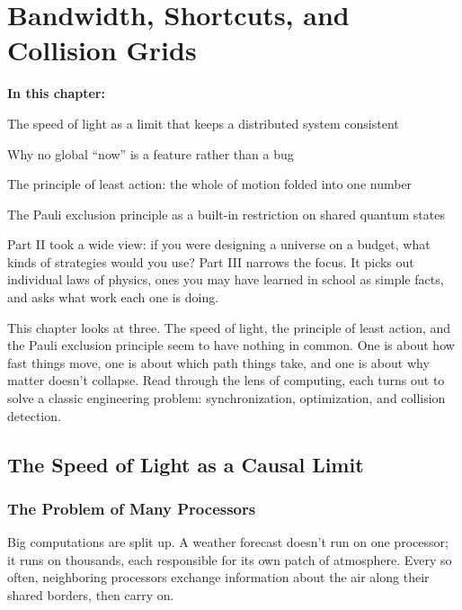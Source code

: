 \chapter{Bandwidth, Shortcuts, and Collision Grids}

\begin{chaptermapbox}
\textbf{In this chapter:}
\begin{compactchecklist}
\item The speed of light as a limit that keeps a distributed system consistent
\item Why no global ``now'' is a feature rather than a bug
\item The principle of least action: the whole of motion folded into one number
\item The Pauli exclusion principle as a built-in restriction on shared quantum states
\end{compactchecklist}
\end{chaptermapbox}

Part II took a wide view: if you were designing a universe on a budget, what kinds of strategies would you use? Part III narrows the focus. It picks out individual laws of physics, ones you may have learned in school as simple facts, and asks what work each one is doing.

This chapter looks at three. The speed of light, the principle of least action, and the Pauli exclusion principle seem to have nothing in common. One is about how fast things move, one is about which path things take, and one is about why matter doesn't collapse. Read through the lens of computing, each turns out to solve a classic engineering problem: synchronization, optimization, and collision detection.

\section{The Speed of Light as a Causal Limit}

\subsection{The Problem of Many Processors}

Big computations are split up. A weather forecast doesn't run on one processor; it runs on thousands, each responsible for its own patch of atmosphere. Every so often, neighboring processors exchange information about the air along their shared borders, then carry on.

